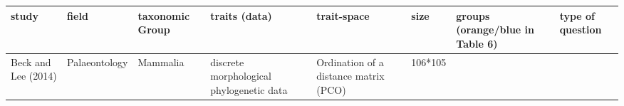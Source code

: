 \documentclass[]{article}
\begin{document}
\begin{longtable}[]{@{}llllllll@{}}
\toprule
\begin{minipage}[b]{0.06\columnwidth}\raggedright\strut
study\strut
\end{minipage} & \begin{minipage}[b]{0.06\columnwidth}\raggedright\strut
field\strut
\end{minipage} & \begin{minipage}[b]{0.14\columnwidth}\raggedright\strut
taxonomic Group\strut
\end{minipage} & \begin{minipage}[b]{0.13\columnwidth}\raggedright\strut
traits (data)\strut
\end{minipage} & \begin{minipage}[b]{0.11\columnwidth}\raggedright\strut
trait-space\strut
\end{minipage} & \begin{minipage}[b]{0.06\columnwidth}\raggedright\strut
size\strut
\end{minipage} & \begin{minipage}[b]{0.07\columnwidth}\raggedright\strut
groups (orange/blue in Table 6)\strut
\end{minipage} & \begin{minipage}[b]{0.15\columnwidth}\raggedright\strut
type of question\strut
\end{minipage}\tabularnewline
\midrule
\endhead
\begin{minipage}[t]{0.06\columnwidth}\raggedright\strut
Beck and Lee (2014)\strut
\end{minipage} & \begin{minipage}[t]{0.06\columnwidth}\raggedright\strut
Palaeontology\strut
\end{minipage} & \begin{minipage}[t]{0.14\columnwidth}\raggedright\strut
Mammalia\strut
\end{minipage} & \begin{minipage}[t]{0.13\columnwidth}\raggedright\strut
discrete morphological phylogenetic data\strut
\end{minipage} & \begin{minipage}[t]{0.11\columnwidth}\raggedright\strut
Ordination of a distance matrix (PCO)\strut
\end{minipage} & \begin{minipage}[t]{0.06\columnwidth}\raggedright\strut
106*105\strut
\end{minipage} & \begin{minipage}[t]{0.07\columnwidth}\raggedright\strut

\end{minipage}
\end{longtable}
\end{document}
